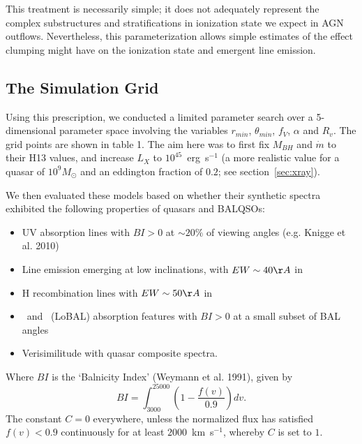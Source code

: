 \documentclass[useAMS,usenatbib]{mn2e_x}
\begin{document}
This treatment is necessarily simple; it does not adequately
represent the complex substructures and stratifications in ionization
state we expect in AGN outflows. Nevertheless, this parameterization allows simple estimates
of the effect clumping might have on the ionization state and emergent 
line emission.




\subsection{The Simulation Grid}

Using this prescription, we conducted a limited parameter
search over a 5-dimensional parameter space involving the 
variables $r_{min}$, $\theta_{min}$, $f_V$, $\alpha$ and $R_v$.
The grid points are shown in table 1.
The aim here was to first fix $M_{BH}$ and $\dot{m}$ to their H13 values,
and increase $L_X$ to $10^{45}$~erg~s$^{-1}$ (a more realistic value for a 
quasar of $10^9M_\odot$ and an eddington fraction of $0.2$; see section~\ref{sec:xray}).

We then evaluated these models based on whether their synthetic spectra exhibited the 
following properties of quasars and BALQSOs:

\begin{itemize}
\item UV absorption lines 
with $BI > 0$ at $\sim20\%$ of viewing angles (e.g. Knigge et al. 2010)
\item Line emission emerging at low inclinations, with $EW\sim40\AA$ in \civ\ \citep[e.g. ][]{shen2011}
\item H recombination lines with $EW\sim50\AA$ in \la\ \citep[e.g. ][]{shen2011}
\item  \mg\ and \al\ (LoBAL) absorption features with $BI > 0$ at a small subset of BAL angles
\item Verisimilitude with quasar composite spectra.
\end{itemize}
Where $BI$ is the `Balnicity Index' (Weymann et al. 1991), given by
\begin{equation}
BI = \int^{25000}_{3000} \left( 1 - \frac{f(v)}{0.9} \right) dv.
\end{equation}
The constant $C=0$ everywhere, unless the normalized flux
has satisfied $f(v)<0.9$ continuously for at least $2000$~km~s$^{−1}$, 
whereby $C$ is set to $1$.
\end{document}
